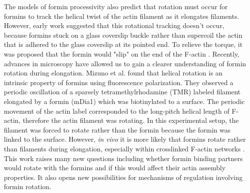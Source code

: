 The models of formin processivity also predict that rotation must occur for formins to track the helical twist of the actin filament as it elongates filaments. However, early work suggested that this rotational tracking doesn't occur, because formins stuck on a glass coverslip buckle rather than supercoil the actin that is adhered to the glass coverslip at its pointed end. To relieve the torque, it was proposed that the formin would "slip" on the end of the F-actin \citep{kovar_insertional_2004,shemesh_novel_2005}. Recently, advances in microscopy have allowed us to gain a clearer understanding of formin rotation during elongation. Mizuno et al. found that helical rotation is an intrinsic property of formins using fluorescence polarization. They observed a periodic oscillation of a sparsely tetramethylrhodamine (TMR) labeled filament elongated by a formin (mDia1) which was biotinylated to a surface. The periodic movement of the actin label corresponded to the long-pitch helical length of F-actin, therefore the actin filament was rotating. In this experimental setup, the filament was forced to rotate rather than the formin because the formin was linked to the surface. However, \textit{in vivo} it is more likely that formins rotate rather than filaments during elongation, especially within crosslinked F-actin networks \citep{mizuno_rotational_2011}. This work raises many new questions including whether formin binding partners would rotate with the formins and if this would affect their actin assembly properties. It also opens new possibilities for mechanisms of regulation involving formin rotation. 

